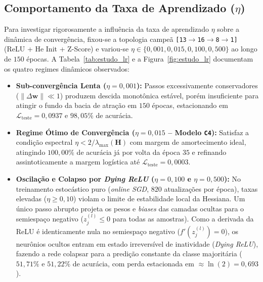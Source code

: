 \documentclass[runningheads]{llncs}
\begin{document}
\subsection{Comportamento da Taxa de Aprendizado ($\eta$)}
Para investigar rigorosamente a influ\^{e}ncia da taxa de aprendizado $\eta$ sobre a din\^{a}mica de converg\^{e}ncia, fixou-se a topologia campe\~{a} \texttt{[13$\to$16$\to$8$\to$1]} (ReLU + He Init + Z-Score) e variou-se $\eta \in \{0{,}001, 0{,}015, 0{,}100, 0{,}500\}$ ao longo de $150$ \'{e}pocas. A Tabela~\ref{tab:estudo_lr} e a Figura~\ref{fig:estudo_lr} documentam os quatro regimes din\^{a}micos observados:
\begin{itemize}
    \item \textbf{Sub-converg\^{e}ncia Lenta ($\eta = 0{,}001$):} Passos excessivamente conservadores ($\|\Delta \mathbf{w}\| \ll 1$) produzem descida monot\^{o}nica est\'{a}vel, por\'{e}m insuficiente para atingir o fundo da bacia de atra\c{c}\~{a}o em $150$ \'{e}pocas, estacionando em $\mathcal{L}_{\text{teste}} = 0{,}0937$ e $98{,}05\%$ de acur\'{a}cia.
    \item \textbf{Regime \'{O}timo de Converg\^{e}ncia ($\eta = 0{,}015$ -- Modelo \texttt{C4}):} Satisfaz a condi\c{c}\~{a}o espectral $\eta < 2/\lambda_{\max}(\mathbf{H})$ com margem de amortecimento ideal, atingindo $100{,}00\%$ de acur\'{a}cia j\'{a} por volta da \'{e}poca $35$ e refinando assintoticamente a margem log\'{i}stica at\'{e} $\mathcal{L}_{\text{teste}} = 0{,}0003$.
    \item \textbf{Oscila\c{c}\~{a}o e Colapso por \textit{Dying ReLU} ($\eta = 0{,}100$ e $\eta = 0{,}500$):} No treinamento estoc\'{a}stico puro (\textit{online SGD}, $820$ atualiza\c{c}\~{o}es por \'{e}poca), taxas elevadas ($\eta \ge 0{,}10$) violam o limite de estabilidade local da Hessiana. Um \'{u}nico passo abrupto projeta os pesos e \textit{biases} das camadas ocultas para o semiespa\c{c}o negativo ($z_j^{(l)} \le 0$ para todas as amostras). Como a derivada da ReLU \'{e} identicamente nula no semiespa\c{c}o negativo ($f'(z_j^{(l)}) = 0$), os neur\^{o}nios ocultos entram em estado irrevers\'{i}vel de inatividade (\textit{Dying ReLU}), fazendo a rede colapsar para a predi\c{c}\~{a}o constante da classe majorit\'{a}ria ($51{,}71\%$ e $51{,}22\%$ de acur\'{a}cia, com perda estacionada em $\approx \ln(2) = 0{,}693$).
\end{itemize}
\end{document}

